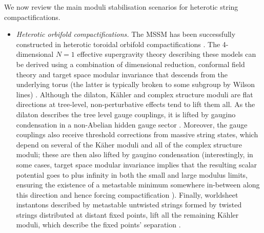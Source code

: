 We  now review the main moduli stabilisation scenarios for heterotic string compactifications.

\begin{itemize}
 \item \emph{Heterotic orbifold compactifications.}  The MSSM has been successfully constructed in heterotic toroidal orbifold compactifications \cite{Buchmuller:2006ik, Lebedev:2006kn,Lebedev:2008un}.  The 4-dimensional $N=1$ effective supergravity theory describing these models can be derived using a combination of dimensional reduction, conformal field theory \cite{Hamidi:1986vh, Dixon:1986qv, Dixon:1989fj} and target space modular invariance that descends from the underlying torus (the latter is typically broken to some subgroup by Wilson lines) \cite{Ferrara:1989bc, Lauer:1989ax, Ibanez:1992hc}.  Although the dilaton, K\"ahler and complex structure moduli are flat directions at tree-level, non-perturbative effects tend to lift them all.  As the dilaton describes the tree level gauge couplings, it is lifted by gaugino condensation in a non-Abelian hidden gauge sector \cite{Nilles:1982ik, Ferrara:1982qs, Dine:1985rz}.  Moreover, the gauge couplings also receive threshold corrections from massive string states, which depend on several of the K\"aher moduli and all of the complex structure moduli; these are then also lifted by gaugino condensation \cite{deCarlos:1991gq, deCarlos:1992kox} (interestingly, in some cases, target space modular invariance implies that the resulting scalar potential goes to plus infinity in both the small and large modulus limits, ensuring the existence of a metastable minimum somewhere in-between along this direction and hence forcing compactification \cite{Font:1990nt, Cvetic:1991qm, Bailin:1993fm}).  Finally, worldsheet instantons described by metastable untwisted strings formed by twisted strings distributed at distant fixed points, lift all the remaining K\"ahler moduli, which describe the fixed points' separation \cite{Lust:1991yi}.  
 

\end{itemize}
